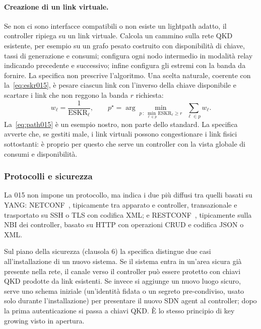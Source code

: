 \paragraph{Creazione di un link virtuale.}
Se non ci sono interfacce compatibili o non esiste un lightpath adatto, il
controller ripiega su un link virtuale. Calcola un cammino sulla rete QKD
esistente, per esempio su un grafo pesato costruito con disponibilità di
chiave, tassi di generazione e consumi; configura ogni nodo intermedio in
modalità relay indicando precedente e successivo; infine configura gli
estremi con la banda da fornire. La specifica non prescrive l'algoritmo.
Una scelta naturale, coerente con la~\eqref{eq:eskr015}, è pesare ciascun
link con l'inverso della chiave disponibile e scartare i link che non
reggono la banda $r$ richiesta:
\begin{equation}
  w_\ell = \frac{1}{\mathrm{ESKR}_\ell}, \qquad
  p^\star = \arg\min_{p\,:\,\min_{\ell\in p}\mathrm{ESKR}_\ell \ge r}
            \;\sum_{\ell\in p} w_\ell .
  \label{eq:path015}
\end{equation}
La~\eqref{eq:path015} è un esempio nostro, non parte dello standard. La
specifica avverte che, se gestiti male, i link virtuali possono congestionare
i link fisici sottostanti: è proprio per questo che serve un controller con
la vista globale di consumi e disponibilità.

\subsubsection{Protocolli e sicurezza}

La 015 non impone un protocollo, ma indica i due più diffusi tra quelli
basati su YANG: NETCONF~\cite{rfc6241}, tipicamente tra apparato e
controller, transazionale e trasportato su SSH o TLS con codifica XML; e
RESTCONF~\cite{rfc8040}, tipicamente sulla NBI dei controller, basato su
HTTP con operazioni CRUD e codifica JSON o XML.

Sul piano della sicurezza (clausola 6) la specifica distingue due casi
all'installazione di un nuovo sistema. Se il sistema entra in un'area
sicura già presente nella rete, il canale verso il controller può essere
protetto con chiavi QKD prodotte da link esistenti. Se invece si aggiunge
un nuovo luogo sicuro, serve uno schema iniziale (un'identità fidata o un
segreto pre-condiviso, usato solo durante l'installazione) per presentare
il nuovo SDN agent al controller; dopo la prima autenticazione si passa a
chiavi QKD. È lo stesso principio di key growing visto in apertura.


